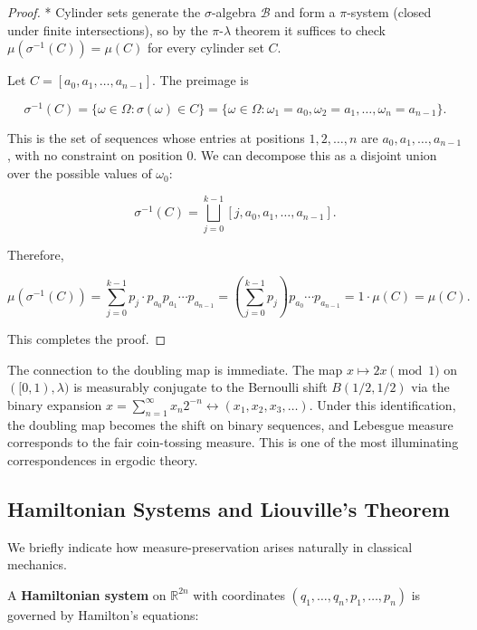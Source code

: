 \begin{proof}
* Cylinder sets generate the $\sigma$-algebra $\mathcal{B}$ and form a $\pi$-system (closed under finite intersections), so by the $\pi$-$\lambda$ theorem it suffices to check $\mu(\sigma^{-1}(C)) = \mu(C)$ for every cylinder set $C$.

Let $C = [a_0, a_1, \ldots, a_{n-1}]$. The preimage is

\[
\sigma^{-1}(C) = \{\omega \in \Omega : \sigma(\omega) \in C\} = \{\omega \in \Omega : \omega_1 = a_0, \omega_2 = a_1, \ldots, \omega_n = a_{n-1}\}.
\]

This is the set of sequences whose entries at positions $1, 2, \ldots, n$ are $a_0, a_1, \ldots, a_{n-1}$, with no constraint on position 0. We can decompose this as a disjoint union over the possible values of $\omega_0$:

\[
\sigma^{-1}(C) = \bigsqcup_{j=0}^{k-1} [j, a_0, a_1, \ldots, a_{n-1}].
\]

Therefore,

\[
\mu(\sigma^{-1}(C)) = \sum_{j=0}^{k-1} p_j \cdot p_{a_0} p_{a_1} \cdots p_{a_{n-1}} = \left(\sum_{j=0}^{k-1} p_j\right) p_{a_0} \cdots p_{a_{n-1}} = 1 \cdot \mu(C) = \mu(C).
\]

This completes the proof.
\end{proof}


\begin{remark}
The connection to the doubling map is immediate. The map $x \mapsto 2x \pmod{1}$ on $([0,1), \lambda)$ is measurably conjugate to the Bernoulli shift $B(1/2, 1/2)$ via the binary expansion $x = \sum_{n=1}^\infty x_n 2^{-n} \leftrightarrow (x_1, x_2, x_3, \ldots)$. Under this identification, the doubling map becomes the shift on binary sequences, and Lebesgue measure corresponds to the fair coin-tossing measure. This is one of the most illuminating correspondences in ergodic theory.
\end{remark}


\subsection{Hamiltonian Systems and Liouville's Theorem}\label{sec:8.2.6}

We briefly indicate how measure-preservation arises naturally in classical mechanics.

A \textbf{Hamiltonian system} on $\mathbb{R}^{2n}$ with coordinates $(q_1, \ldots, q_n, p_1, \ldots, p_n)$ is governed by Hamilton's equations:

